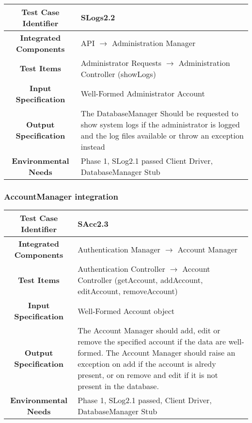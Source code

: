 \documentclass[11pt, a4paper,titlepage]{article}
\begin{document}
		  \subsubsection{}
		  \begin{tabularx}{\textwidth}{| c|X|}
		  	\hline \textbf{Test Case Identifier} & \label{SLogs2.2}SLogs2.2 \\
		  	\hline \textbf{Integrated Components} &  API $\rightarrow $ Administration Manager \\
		  	\hline \textbf{Test Items} &  Administrator Requests  $\rightarrow $ Administration Controller (showLogs)\\
		  	\hline \textbf{Input Specification} &  Well-Formed Administrator Account\\
		  	\hline \textbf{Output Specification} & The DatabaseManager Should be requested to show system logs if the administrator is logged and the log files available or throw an exception instead\\
		  	\hline \textbf{Environmental Needs} &  Phase 1, SLog2.1 passed \newline 
		  	Client Driver, DatabaseManager Stub\\
		  	\hline
		  \end{tabularx}
		  \newline
		 
		\subsubsection{AccountManager integration}
		 \begin{tabularx}{\textwidth}{| c|X|}
		 	\hline \textbf{Test Case Identifier} & \label{SAcc2.3}SAcc2.3 \\
		 	\hline \textbf{Integrated Components} &  Authentication Manager $\rightarrow $ Account Manager \\
		 	\hline \textbf{Test Items} &  Authentication Controller  $\rightarrow $ Account Controller (getAccount, addAccount, editAccount, removeAccount)\\
		 	\hline \textbf{Input Specification} &  Well-Formed Account object\\
		 	\hline \textbf{Output Specification} & The Account Manager should add, edit or remove the specified account if the data are well-formed. \newline The Account Manager should raise an exception on add if the account is alredy present, or on remove and edit if it is not present in the database.\\
		 	\hline \textbf{Environmental Needs} &  Phase 1, SLog2.1 passed, \newline 
		 	Client Driver, DatabaseManager Stub\\
		 	\hline
		 \end{tabularx}
		 \newline
\end{document}
